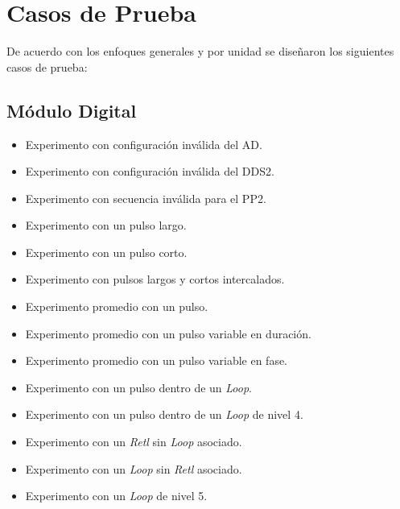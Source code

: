 \section{Casos de Prueba}

De acuerdo con los enfoques generales y por unidad se dise\~naron los siguientes casos de prueba:

\subsection{M\'odulo Digital}
\begin{itemize}
\item Experimento con configuraci\'on inv\'alida del AD.
\item Experimento con configuraci\'on inv\'alida del DDS2.
\item Experimento con secuencia inv\'alida para el PP2.
\item Experimento con un pulso largo.
\item Experimento con un pulso corto.
\item Experimento con pulsos largos y cortos intercalados.
\item Experimento promedio con un pulso.
\item Experimento promedio con un pulso variable en duraci\'on.
\item Experimento promedio con un pulso variable en fase.
\item Experimento con un pulso dentro de un \textit{Loop}.
\item Experimento con un pulso dentro de un \textit{Loop} de nivel 4.
\item Experimento con un \textit{Retl} sin \textit{Loop} asociado.
\item Experimento con un \textit{Loop} sin \textit{Retl} asociado.
\item Experimento con un \textit{Loop} de nivel 5.
\end{itemize}


